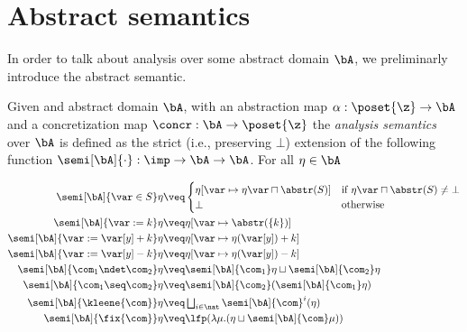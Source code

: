 \section{Abstract semantics}
\label{sec:abstractsem}

In order to talk about analysis over some abstract domain \(\bA\), we
preliminarly introduce the abstract semantic.

\begin{definition}\label{def:abstrsem}
  Given and abstract domain \(\bA\), with an abstraction map
  \({\alpha : \poset{\z} \to \bA}\) and a concretization map
  \({\concr : \bA \to \poset{\z}}\) the \emph{analysis semantics} over
  \(\bA\) is defined as the strict (i.e., preserving \(\bot\))
  extension of the following function
  \({\semi[\bA]{\cdot} : \imp \to \bA \to \bA}\). For all
  \(\eta \in \bA\)

  \begin{align*}
    \semi[\bA]{\var \in S}\eta 
    & \veq  
      \begin{cases}
        \eta[\var \mapsto \eta\var \sqcap \abstr(S)] & \text{if }\eta\var\sqcap \abstr(S)\neq \bot \\
        \bot & \text{otherwise}
      \end{cases}\\
    \semi[\bA]{\var := k}\eta 
    & \veq \eta[\var \mapsto \abstr(\{k\})]\\
    \semi[\bA]{\var := \var[y] + k}\eta 
    & \veq \eta[\var \mapsto \eta (\var[y]) + k]\\
    \semi[\bA]{\var := \var[y] - k}\eta 
    & \veq \eta[\var \mapsto \eta (\var[y]) - k]\\
    \semi[\bA]{\com_1 \ndet \com_2} \eta
    & \veq \semi[\bA]{\com_1} \eta \sqcup \semi[\bA]{\com_2} \eta\\
    \semi[\bA]{\com_1 \seq \com_2} \eta
    & \veq \semi[\bA]{\com_2} (\semi[\bA]{\com_1} \eta)\\
    \semi[\bA]{\kleene{\com}} \eta
    & \veq \textstyle \bigsqcup_{i \in \nat} \semi[\bA]{\com}^i (\eta)\\
    \semi[\bA]{\fix{\com}} \eta
    & \veq  \lfp(\lambda \mu. (\eta \sqcup \semi[\bA]{\com} \mu))
  \end{align*}
\end{definition}

